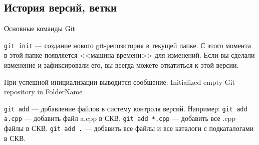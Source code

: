  
\subsection{История версий, ветки}
\begin{frame}[t]{Основные команды Git}

\texttt{git init} --- создание нового git-репозитория в текущей папке.
С этого момента в этой папке появляется <<машина времени>> для изменений.
Если вы сделали изменение и зафиксировали его, вы всегда можете откатиться к этой версии.

При успешной инициализации выводится сообщение:
Initialized empty Git repository in FolderName

\texttt{git add} --- добавление файлов в систему контроля версий.
Например: \texttt{git add a.cpp} --- добавить файл a.cpp в СКВ.
\texttt{git add *.cpp} --- добавить все .cpp файлы в СКВ. 
\texttt{git add .} --- добавить все файлы и все каталоги с подкаталогами в СКВ. 

\end{frame}







                                         